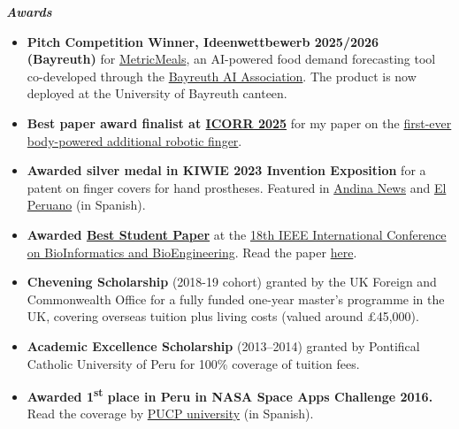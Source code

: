 \documentclass[a4paper,10pt]{article}
\begin{document}
\vspace{4pt}
\textbf{\textit{Awards}}
\begin{itemize}
  \item \textbf{Pitch Competition Winner, Ideenwettbewerb 2025/2026 (Bayreuth)} for
        \href{https://www.uni-bayreuth.de/pressemitteilung/ki-gegen-food-waste}{MetricMeals},
        an AI-powered food demand forecasting tool co-developed through the \href{https://www.ai-association.uni-bayreuth.de/en/index.html}{Bayreuth AI
        Association}. The product is now deployed at the University of Bayreuth canteen.
  \item \textbf{Best paper award finalist at
        \href{https://icorr-c.org/icorr_2025/}{ICORR 2025}} for my paper on the
        \href{https://ieeexplore.ieee.org/document/11063063}{first-ever body-powered additional
        robotic finger}.
  \item \textbf{Awarded silver medal in KIWIE 2023 Invention Exposition} for a patent on finger
        covers for hand prostheses. Featured in
        \href{https://andina.pe/agencia/noticia-invento-peruano-para-recubrir-protesis-mano-fue-premiado-corea-del-sur-954860.aspx}{Andina News}
        and \href{https://www.elperuano.pe/noticia/223247-invento-peruano-es-premiado-en-corea}{El Peruano}
        (in Spanish).
  \item \textbf{Awarded
        \href{https://bibe2018.asia.edu.tw/uploads/asset/data/659626b8367376243a65b6c3/data-paper-std-status-award-1.pdf}{Best Student Paper}}
        at the
        \href{http://bibe2018.asia.edu.tw/}{18th IEEE International Conference on BioInformatics and BioEngineering}.
        Read the paper \href{https://ieeexplore.ieee.org/document/8567461}{here}.
  \item \textbf{Chevening Scholarship} (2018-19 cohort) granted by the UK Foreign and
        Commonwealth Office for a fully funded one-year master's programme in the UK, covering
        overseas tuition plus living costs (valued around \pounds45,000).
  \item \textbf{Academic Excellence Scholarship} (2013--2014) granted by Pontifical Catholic
        University of Peru for 100\% coverage of tuition fees.
  \item \textbf{Awarded 1\textsuperscript{st} place in Peru in NASA Space Apps Challenge 2016.}
        Read the coverage by
        \href{https://puntoedu.pucp.edu.pe/noticia/equipo-de-la-pucp-gana-primer-puesto-en-nasa-space-apps-challenge/}{PUCP university}
        (in Spanish).
\end{itemize}
\end{document}
